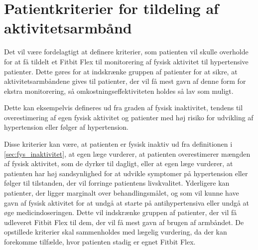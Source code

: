 \section{Patientkriterier for tildeling af aktivitetsarmbånd} \label{sec:kriterier}

Det vil være fordelagtigt at definere kriterier, som patienten vil skulle overholde for at få tildelt et Fitbit Flex til monitorering af fysisk aktivitet til hypertensive patienter. Dette gøres for at indskrænke gruppen af patienter for at sikre, at aktivitetsarmbåndene gives til patienter, der vil få mest gavn af denne form for ekstra monitorering, så omkostningseffektiviteten holdes så lav som muligt.

Dette kan eksempelvis defineres ud fra graden af fysisk inaktivitet, tendens til overestimering af egen fysisk aktivitet og patienter med høj risiko for udvikling af hypertension eller følger af hypertension. 

Disse kriterier kan være, at patienten er fysisk inaktiv ud fra definitionen i \autoref{sec:fys_inaktivitet}, at egen læge vurderer, at patienten overestimerer mængden af fysisk aktivitet, som de dyrker til dagligt, eller at egen læge vurderer, at patienten har høj sandsynlighed for at udvikle symptomer på hypertension eller følger til tilstanden, der vil forringe patientens livskvalitet. Yderligere kan patienter, der ligger marginalt over behandlingsmålet, og som vil kunne have gavn af fysisk aktivitet for at undgå at starte på antihypertensiva eller undgå at øge medicindoseringen. Dette vil indskrænke gruppen af patienter, der vil få udleveret Fitbit Flex til dem, der vil få mest gavn af brugen af armbåndet. 
De opstillede kriterier skal sammenholdes med lægelig vurdering, da der kan forekomme tilfælde, hvor patienten stadig er egnet Fitbit Flex. 


